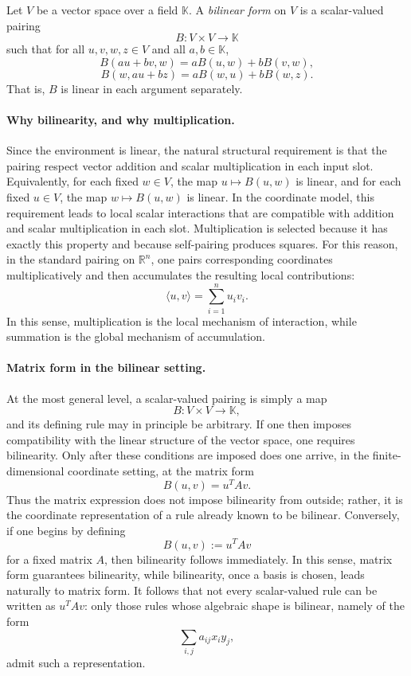 \documentclass{article}
\begin{document}
\begin{definition}
Let $V$ be a vector space over a field $\mathbb{K}$. A \emph{bilinear form} on $V$ is a scalar-valued pairing
$$
B:V\times V\to\mathbb{K}
$$
such that for all $u,v,w,z\in V$ and all $a,b\in\mathbb{K}$,
$$
B(au+bv,w)=aB(u,w)+bB(v,w),
$$
$$
B(w,au+bz)=aB(w,u)+bB(w,z).
$$
That is, $B$ is linear in each argument separately.
\end{definition}

\paragraph{Why bilinearity, and why multiplication.}
Since the environment is linear, the natural structural requirement is that the pairing respect vector addition and scalar multiplication in each input slot. Equivalently, for each fixed $w\in V$, the map $u\mapsto B(u,w)$ is linear, and for each fixed $u\in V$, the map $w\mapsto B(u,w)$ is linear. In the coordinate model, this requirement leads to local scalar interactions that are compatible with addition and scalar multiplication in each slot. Multiplication is selected because it has exactly this property and because self-pairing produces squares. For this reason, in the standard pairing on $\mathbb{R}^n$, one pairs corresponding coordinates multiplicatively and then accumulates the resulting local contributions:
$$
\langle u,v\rangle=\sum_{i=1}^n u_i v_i.
$$
In this sense, multiplication is the local mechanism of interaction, while summation is the global mechanism of accumulation.

\paragraph{Matrix form in the bilinear setting.}
At the most general level, a scalar-valued pairing is simply a map
$$
B:V\times V\to \mathbb{K},
$$
and its defining rule may in principle be arbitrary. If one then imposes compatibility with the linear structure of the vector space, one requires bilinearity. Only after these conditions are imposed does one arrive, in the finite-dimensional coordinate setting, at the matrix form
$$
B(u,v)=u^TAv.
$$
Thus the matrix expression does not impose bilinearity from outside; rather, it is the coordinate representation of a rule already known to be bilinear. Conversely, if one begins by defining
$$
B(u,v):=u^TAv
$$
for a fixed matrix $A$, then bilinearity follows immediately. In this sense, matrix form guarantees bilinearity, while bilinearity, once a basis is chosen, leads naturally to matrix form. It follows that not every scalar-valued rule can be written as $u^TAv$: only those rules whose algebraic shape is bilinear, namely of the form
$$
\sum_{i,j} a_{ij}x_i y_j,
$$
admit such a representation.
\end{document}
